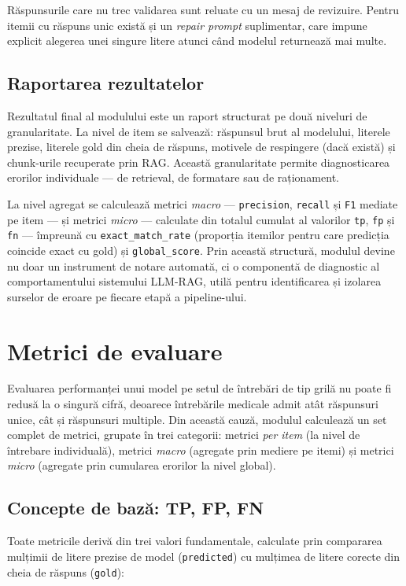 \documentclass[12pt, a4paper, oneside, romanian]{teza-upb}
\begin{document}
Răspunsurile care nu trec validarea sunt reluate cu un mesaj de revizuire. Pentru itemii cu răspuns unic există și un \textit{repair prompt} suplimentar, care impune explicit alegerea unei singure litere atunci când modelul returnează mai multe.
\subsection{Raportarea rezultatelor}

Rezultatul final al modulului este un raport structurat pe două niveluri de granularitate. La nivel de item se salvează: răspunsul brut al modelului, literele prezise, literele gold din cheia de răspuns, motivele de respingere (dacă există) și chunk-urile recuperate prin RAG. Această granularitate permite diagnosticarea erorilor individuale --- de retrieval, de formatare sau de raționament.

La nivel agregat se calculează metrici \textit{macro} --- \texttt{precision}, \texttt{recall} și \texttt{F1} mediate pe item --- și metrici \textit{micro} --- calculate din totalul cumulat al valorilor \texttt{tp}, \texttt{fp} și \texttt{fn} --- împreună cu \texttt{exact\_match\_rate} (proporția itemilor pentru care predicția coincide exact cu gold) și \texttt{global\_score}. Prin această structură, modulul devine nu doar un instrument de notare automată, ci o componentă de diagnostic al comportamentului sistemului LLM-RAG, utilă pentru identificarea și izolarea surselor de eroare pe fiecare etapă a pipeline-ului.

\section{Metrici de evaluare}

Evaluarea performanței unui model pe setul de întrebări de tip grilă nu poate fi redusă la o singură cifră, deoarece întrebările medicale admit atât răspunsuri unice, cât și răspunsuri multiple. Din această cauză, modulul calculează un set complet de metrici, grupate în trei categorii: metrici \textit{per item} (la nivel de întrebare individuală), metrici \textit{macro} (agregate prin mediere pe itemi) și metrici \textit{micro} (agregate prin cumularea erorilor la nivel global).

\subsection{Concepte de bază: TP, FP, FN}

Toate metricile derivă din trei valori fundamentale, calculate prin compararea mulțimii de litere prezise de model (\texttt{predicted}) cu mulțimea de litere corecte din cheia de răspuns (\texttt{gold}):
\end{document}

